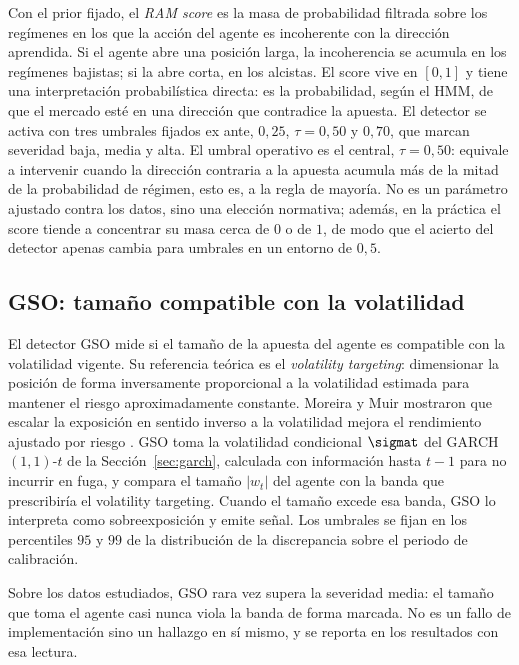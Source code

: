 Con el prior fijado, el \emph{RAM score} es la masa de probabilidad filtrada sobre los regímenes en los que la acción del agente es incoherente con la dirección aprendida. Si el agente abre una posición larga, la incoherencia se acumula en los regímenes bajistas; si la abre corta, en los alcistas. El score vive en $[0,1]$ y tiene una interpretación probabilística directa: es la probabilidad, según el HMM, de que el mercado esté en una dirección que contradice la apuesta. El detector se activa con tres umbrales fijados ex ante, $0{,}25$, $\tau = 0{,}50$ y $0{,}70$, que marcan severidad baja, media y alta. El umbral operativo es el central, $\tau = 0{,}50$: equivale a intervenir cuando la dirección contraria a la apuesta acumula más de la mitad de la probabilidad de régimen, esto es, a la regla de mayoría. No es un parámetro ajustado contra los datos, sino una elección normativa; además, en la práctica el score tiende a concentrar su masa cerca de $0$ o de $1$, de modo que el acierto del detector apenas cambia para umbrales en un entorno de $0{,}5$.

\subsection{GSO: tamaño compatible con la volatilidad}
\label{sec:strata-gso}

El detector GSO mide si el tamaño de la apuesta del agente es compatible con la volatilidad vigente. Su referencia teórica es el \emph{volatility targeting}: dimensionar la posición de forma inversamente proporcional a la volatilidad estimada para mantener el riesgo aproximadamente constante. Moreira y Muir mostraron que escalar la exposición en sentido inverso a la volatilidad mejora el rendimiento ajustado por riesgo \cite{moreira2017}. GSO toma la volatilidad condicional $\sigmat$ del GARCH$(1,1)$-$t$ de la Sección~\ref{sec:garch}, calculada con información hasta $t-1$ para no incurrir en fuga, y compara el tamaño $|w_t|$ del agente con la banda que prescribiría el volatility targeting. Cuando el tamaño excede esa banda, GSO lo interpreta como sobreexposición y emite señal. Los umbrales se fijan en los percentiles $95$ y $99$ de la distribución de la discrepancia sobre el periodo de calibración.

Sobre los datos estudiados, GSO rara vez supera la severidad media: el tamaño que toma el agente casi nunca viola la banda de forma marcada. No es un fallo de implementación sino un hallazgo en sí mismo, y se reporta en los resultados con esa lectura.

